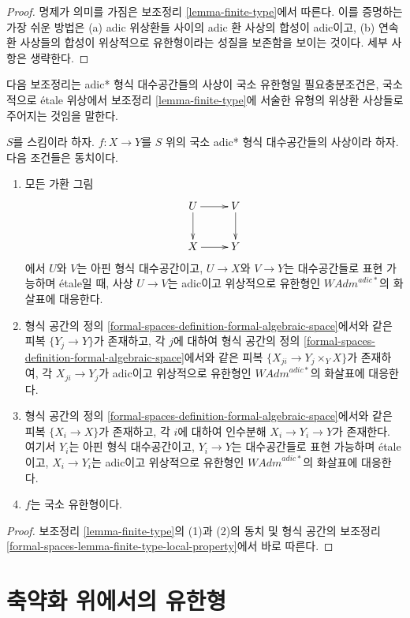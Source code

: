 \begin{proof}
명제가 의미를 가짐은 보조정리 \ref{lemma-finite-type}에서 따른다.
이를 증명하는 가장 쉬운 방법은 (a) adic 위상환들 사이의 adic 환 사상의
합성이 adic이고, (b) 연속 환 사상들의 합성이 위상적으로 유한형이라는
성질을 보존함을 보이는 것이다. 세부 사항은 생략한다.
\end{proof}

\noindent
다음 보조정리는 adic* 형식 대수공간들의 사상이 국소 유한형일
필요충분조건은, 국소적으로 \'etale 위상에서 보조정리
\ref{lemma-finite-type}에 서술한 유형의 위상환 사상들로 주어지는 것임을 말한다.

\begin{lemma}
\label{lemma-finite-type-morphisms}
$S$를 스킴이라 하자. $f : X \to Y$를 $S$ 위의
국소 adic* 형식 대수공간들의 사상이라 하자. 다음 조건들은 동치이다.
\begin{enumerate}
\item 모든 가환 그림
$$
\xymatrix{
U \ar[d] \ar[r] & V \ar[d] \\
X \ar[r] & Y
}
$$
에서 $U$와 $V$는 아핀 형식 대수공간이고, $U \to X$와 $V \to Y$는
대수공간들로 표현 가능하며 \'etale일 때, 사상 $U \to V$는
adic이고 위상적으로 유한형인 $\textit{WAdm}^{adic*}$의 화살표에 대응한다.
\item 형식 공간의 정의
\ref{formal-spaces-definition-formal-algebraic-space}에서와 같은 피복
$\{Y_j \to Y\}$가 존재하고, 각 $j$에 대하여 형식 공간의 정의
\ref{formal-spaces-definition-formal-algebraic-space}에서와 같은 피복
$\{X_{ji} \to Y_j \times_Y X\}$가 존재하여, 각 $X_{ji} \to Y_j$가
adic이고 위상적으로 유한형인 $\textit{WAdm}^{adic*}$의 화살표에 대응한다.
\item 형식 공간의 정의
\ref{formal-spaces-definition-formal-algebraic-space}에서와 같은 피복
$\{X_i \to X\}$가 존재하고, 각 $i$에 대하여 인수분해
$X_i \to Y_i \to Y$가 존재한다. 여기서 $Y_i$는 아핀 형식 대수공간이고,
$Y_i \to Y$는 대수공간들로 표현 가능하며 \'etale이고,
$X_i \to Y_i$는 adic이고 위상적으로 유한형인
$\textit{WAdm}^{adic*}$의 화살표에 대응한다.
\item $f$는 국소 유한형이다.
\end{enumerate}
\end{lemma}

\begin{proof}
보조정리 \ref{lemma-finite-type}의 (1)과 (2)의 동치 및 형식 공간의 보조정리
\ref{formal-spaces-lemma-finite-type-local-property}에서 바로 따른다.
\end{proof}


\section{축약화 위에서의 유한형}
\label{section-finite-type-red}

